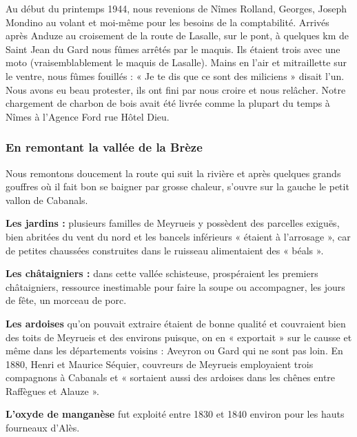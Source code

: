 Au début du printemps 1944, nous revenions de Nîmes Rolland, Georges, Joseph Mondino au
volant et moi-même pour les besoins de la comptabilité. Arrivés après Anduze au croisement
de la route de Lasalle, sur le pont, à quelques km de Saint Jean du Gard nous fûmes arrêtés
par le maquis. Ils étaient trois avec une moto (vraisemblablement le maquis de Lasalle).
Mains en l’air et mitraillette sur le ventre, nous fûmes fouillés : « Je te dis que ce sont des
miliciens » disait l’un. Nous avons eu beau protester, ils ont fini par nous croire et nous
relâcher. Notre chargement de charbon de bois avait été livrée comme la plupart du temps à
Nîmes à l’Agence Ford rue Hôtel Dieu.



\subsubsection{En remontant la vallée de la Brèze}

Nous remontons doucement la route qui suit la rivière et après quelques grands gouffres où il
fait bon se baigner par grosse chaleur, s’ouvre sur la gauche le petit vallon de Cabanals.

\textbf{Les jardins :} plusieurs familles de Meyrueis y possèdent des parcelles exiguës, bien abritées
du vent du nord et les bancels inférieurs « étaient à l’arrosage », car de petites chaussées
construites dans le ruisseau alimentaient des « béals ».

\textbf{Les châtaigniers :} dans cette vallée schisteuse, prospéraient les premiers châtaigniers,
ressource inestimable pour faire la soupe ou accompagner, les jours de fête, un morceau de
porc.

\textbf{Les ardoises} qu’on pouvait extraire étaient de bonne qualité et couvraient bien des toits de
Meyrueis et des environs puisque, on en « exportait » sur le causse et même dans les
départements voisins : Aveyron ou Gard qui ne sont pas loin. En 1880, Henri et Maurice
Séquier, couvreurs de Meyrueis employaient trois compagnons à Cabanals et « sortaient aussi
des ardoises dans les chênes entre Raffègues et Alauze ».

\textbf{L’oxyde de manganèse} fut exploité entre 1830 et 1840 environ pour les hauts fourneaux
d’Alès.

\vspace{0.2cm}

